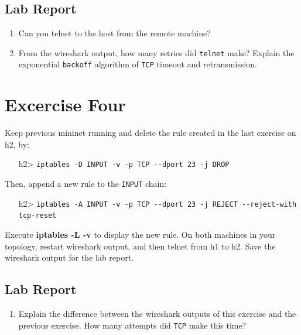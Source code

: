 \documentclass[10pt,a4paper]{article}
\numberwithin{equation}{section}
\numberwithin{figure}{section}
\numberwithin{table}{section}
\begin{document}
\subsection{Lab Report}
\begin{enumerate}
	\setlength{\itemindent}{0pt}
	\item Can you telnet to the host from the remote machine?
	\item From the wireshark output, how many retries did \texttt{telnet} make? Explain the exponential \texttt{backoff} algorithm of \texttt{TCP} timeout and retransmission.
\end{enumerate}

\section{Excercise Four}
Keep previous mininet running and delete the rule created in the last exercise on h2, by:

\begin{itemize}
	\setlength{\itemindent}{10pt}
	\item [h2>] \texttt{iptables -D INPUT -v -p TCP {-}{-}dport 23 -j DROP}
\end{itemize}

\setlength{\parindent}{0pt}
Then, append a new rule to the \texttt{INPUT} chain:

\begin{itemize}
	\setlength{\itemindent}{10pt}
	\item [h2>] \texttt{iptables -A INPUT -v -p TCP {-}{-}dport 23 -j REJECT {-}{-}reject-with tcp-reset} 
\end{itemize}

\setlength{\parindent}{0pt}
Execute \textbf{iptables -L -v} to display the new rule. On both machines in your topology, restart wireshark output, and then telnet from h1 to h2. Save the wireshark output for the lab report.

\subsection{Lab Report}
\begin{enumerate}
	\setlength{\itemindent}{0pt}
	\item Explain the difference between the wireshark outputs of this exercise and the previous exercise. How many attempts did \texttt{TCP} make this time?
\end{enumerate}

\pagebreak
\end{document}
